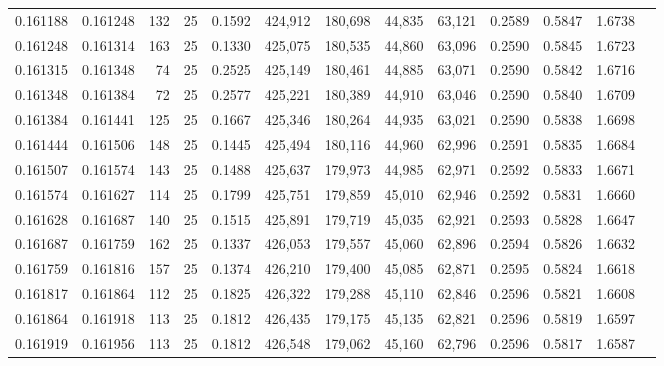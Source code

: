 \begin{tabular}{rrrrrrrrrrrrr}
0.161188 & 0.161248 &   132 &  25 &                                     0.1592 & 424,912 & 180,698 &  44,835 &  63,121 & 0.2589 & 0.5847 & 1.6738 \\
0.161248 & 0.161314 &   163 &  25 &                                     0.1330 & 425,075 & 180,535 &  44,860 &  63,096 & 0.2590 & 0.5845 & 1.6723 \\
0.161315 & 0.161348 &    74 &  25 &                                     0.2525 & 425,149 & 180,461 &  44,885 &  63,071 & 0.2590 & 0.5842 & 1.6716 \\
0.161348 & 0.161384 &    72 &  25 &                                     0.2577 & 425,221 & 180,389 &  44,910 &  63,046 & 0.2590 & 0.5840 & 1.6709 \\
0.161384 & 0.161441 &   125 &  25 &                                     0.1667 & 425,346 & 180,264 &  44,935 &  63,021 & 0.2590 & 0.5838 & 1.6698 \\
0.161444 & 0.161506 &   148 &  25 &                                     0.1445 & 425,494 & 180,116 &  44,960 &  62,996 & 0.2591 & 0.5835 & 1.6684 \\
0.161507 & 0.161574 &   143 &  25 &                                     0.1488 & 425,637 & 179,973 &  44,985 &  62,971 & 0.2592 & 0.5833 & 1.6671 \\
0.161574 & 0.161627 &   114 &  25 &                                     0.1799 & 425,751 & 179,859 &  45,010 &  62,946 & 0.2592 & 0.5831 & 1.6660 \\
0.161628 & 0.161687 &   140 &  25 &                                     0.1515 & 425,891 & 179,719 &  45,035 &  62,921 & 0.2593 & 0.5828 & 1.6647 \\
0.161687 & 0.161759 &   162 &  25 &                                     0.1337 & 426,053 & 179,557 &  45,060 &  62,896 & 0.2594 & 0.5826 & 1.6632 \\
0.161759 & 0.161816 &   157 &  25 &                                     0.1374 & 426,210 & 179,400 &  45,085 &  62,871 & 0.2595 & 0.5824 & 1.6618 \\
0.161817 & 0.161864 &   112 &  25 &                                     0.1825 & 426,322 & 179,288 &  45,110 &  62,846 & 0.2596 & 0.5821 & 1.6608 \\
0.161864 & 0.161918 &   113 &  25 &                                     0.1812 & 426,435 & 179,175 &  45,135 &  62,821 & 0.2596 & 0.5819 & 1.6597 \\
0.161919 & 0.161956 &   113 &  25 &                                     0.1812 & 426,548 & 179,062 &  45,160 &  62,796 & 0.2596 & 0.5817 & 1.6587 \\

\end{tabular}
